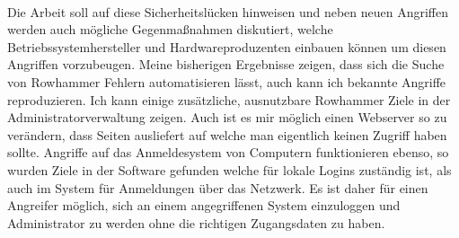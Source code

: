\documentclass[a4paper]{article}
\begin{document}
\paragraph{}

Die Arbeit soll auf diese Sicherheitslücken hinweisen und neben neuen Angriffen
werden auch mögliche Gegenmaßnahmen diskutiert, welche Betriebssystemhersteller
und Hardwareproduzenten einbauen können um diesen Angriffen vorzubeugen.
Meine bisherigen Ergebnisse zeigen, dass sich die Suche von Rowhammer Fehlern
automatisieren lässt, auch kann ich bekannte Angriffe reproduzieren.
Ich kann einige zusätzliche, ausnutzbare Rowhammer Ziele in der
Administratorverwaltung zeigen. Auch ist es mir möglich einen
Webserver so zu verändern, dass Seiten ausliefert auf welche man eigentlich
keinen Zugriff haben sollte. Angriffe auf das Anmeldesystem von Computern
funktionieren ebenso, so wurden Ziele in der Software gefunden welche für lokale
Logins zuständig ist, als auch im System für Anmeldungen über das Netzwerk.
Es ist daher für einen Angreifer möglich, sich an einem angegriffenen System
einzuloggen und Administrator zu werden ohne die richtigen Zugangsdaten zu haben.

\pagebreak



\end{document}
